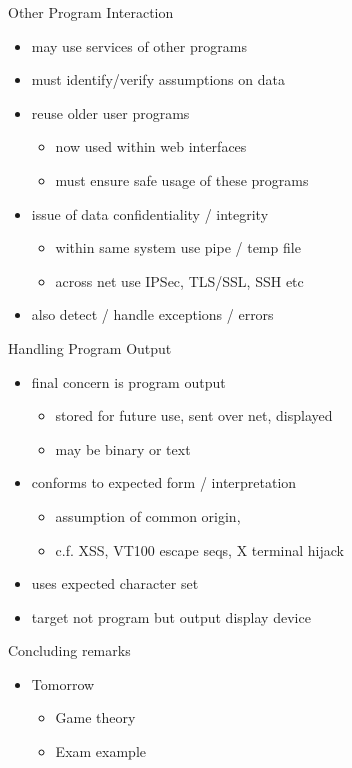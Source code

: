 \documentclass{beamer}
\begin{document}
\begin{frame}{Other Program Interaction}
  \begin{itemize}
  \item may use services of other programs
  \item must identify/verify assumptions on data
  \item reuse older user programs
    \begin{itemize}
    \item now used within web interfaces
    \item must ensure safe usage of these programs
    \end{itemize}
  \item issue of data confidentiality / integrity
    \begin{itemize}
    \item within same system use pipe / temp file
    \item across net use IPSec, TLS/SSL, SSH etc
    \end{itemize}
  \item also detect / handle exceptions / errors
  \end{itemize}
\end{frame}


\begin{frame}{Handling Program Output}
  \begin{itemize}
  \item final concern is program output
    \begin{itemize}
    \item stored for future use, sent over net, displayed
    \item may be binary or text
    \end{itemize}
  \item conforms to expected form / interpretation
    \begin{itemize}
    \item assumption of common origin,
    \item c.f. XSS, VT100 escape seqs, X terminal hijack
    \end{itemize}
  \item uses expected character set
  \item target not program but output display device 
  \end{itemize}
\end{frame}

\begin{frame}{Concluding remarks}
  \begin{itemize}
  \item Tomorrow
    \begin{itemize}
    \item Game theory
    \item Exam example
    \end{itemize}
  \end{itemize}
\end{frame}
\end{document}
